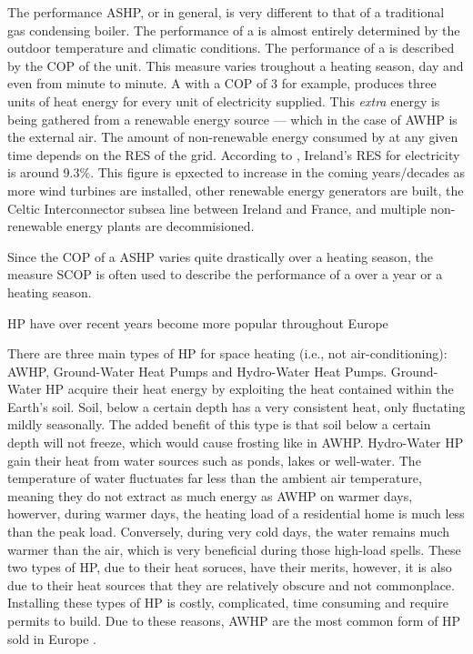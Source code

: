 The performance \acs{ASHP}, or \HPs in general, is very different to that of a traditional gas condensing boiler. The performance of a \HP is almost entirely determined by the outdoor temperature and climatic conditions. The performance of a \HP is described by the \ac{COP} of the unit. This measure varies troughout a heating season, day and even from minute to minute. A \HP with a \ac{COP} of 3 for example, produces three units of heat energy for every unit of electricity supplied. This \textit{extra} energy is being gathered from a renewable energy source --- which in the case of \acs{AWHP} is the external air. The amount of non-renewable energy consumed by \HP at any given time depends on the \ac{RES} of the grid. According to \citeauthor{seai_2020}, Ireland's \ac{RES} for electricity is around 9.3\%. This figure is epxected to increase in the coming years/decades as more wind turbines are installed, other renewable energy generators are built, the Celtic Interconnector subsea line between Ireland and France, and multiple non-renewable energy plants are decommisioned.

Since the \ac{COP} of a \ac{ASHP} varies quite drastically over a heating season, the measure \ac{SCOP} is often used to describe the performance of a \AWHP over a year or a heating season. 




\acs{HP} have over recent years become more popular throughout Europe 

There are three main types of \acs{HP} for space heating (i.e., not air-conditioning): \acs{AWHP}, Ground-Water Heat Pumps and Hydro-Water Heat Pumps. Ground-Water \acs{HP} acquire their heat energy by exploiting the heat contained within the Earth's soil. Soil, below a certain depth has a very consistent heat, only fluctating mildly seasonally. The added benefit of this type is that soil below a certain depth will not freeze, which would cause frosting like in \acs{AWHP}. Hydro-Water \acs{HP} gain their heat from water sources such as ponds, lakes or well-water. The temperature of water fluctuates far less than the ambient air temperature, meaning they do not extract as much energy as \acs{AWHP} on warmer days, howerver, during warmer days, the heating load of a residential home is much less than the peak load. Conversely, during very cold days, the water remains much warmer than the air, which is very beneficial during those high-load spells. These two types of \acs{HP}, due to their heat soruces, have their merits, however, it is also due to their heat sources that they are relatively obscure and not commonplace. Installing these types of \acs{HP} is costly, complicated, time consuming and require permits to build. Due to these reasons, \acs{AWHP} are the most common form of \ac{HP} sold in Europe \cite{epha_2015}.  

